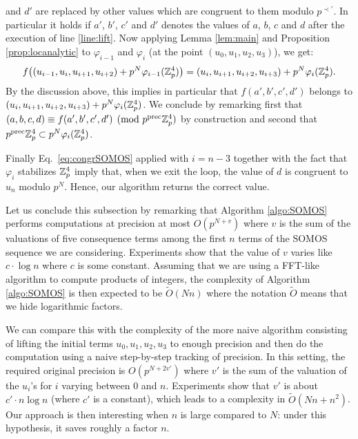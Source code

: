 \documentclass{lms}
\begin{document}
and $d'$ are replaced by other values which are congruent to them modulo
$p^{\prec'}$. In particular it holds if $a'$, $b'$, $c'$ and $d'$ denotes
the values of $a$, $b$, $c$ and $d$ after the execution of line
\ref{line:lift}. Now applying Lemma \ref{lem:main} and Proposition
\ref{prop:locanalytic} to $\varphi_{i-1}$ and $\varphi_i$ (at the point 
$(u_0, u_1, u_2, u_3)$), we get:
$$f\big((u_{i-1}, u_i, u_{i+1}, u_{i+2}) + p^N \varphi_{i-1}(\mathbb Z_p^4)\big)
= (u_i, u_{i+1}, u_{i+2}, u_{i+3}) + p^N \varphi_i(\mathbb Z_p^4).$$
By the discussion above, this implies in particular that $f(a',b',c',d')$
belongs to $(u_i, u_{i+1}, u_{i+2}, u_{i+3}) + p^N \varphi_i(\mathbb Z_p^4)$. We
conclude by remarking first that $(a,b,c,d) \equiv f(a',b',c',d') \pmod 
{p^{\text{\rm prec}} \mathbb Z_p^4}$ by construction and second that $p^{\text{\rm prec}} \mathbb Z_p^4 \subset
p^N \varphi_i(\mathbb Z_p^4)$.

Finally Eq.~\eqref{eq:congrSOMOS} applied with $i = n-3$ together with
the fact that $\varphi_i$ stabilizes $\mathbb Z_p^4$ imply that, when we exit
the loop, the value of $d$ is congruent to $u_n$ modulo $p^N$. Hence,
our algorithm returns the correct value.

\medskip

Let us conclude this subsection by remarking that Algorithm 
\ref{algo:SOMOS} performs computations at precision at most $O(p^{N+v})$ 
where $v$ is the sum of the valuations of five consequence terms among 
the first $n$ terms of the SOMOS sequence we are considering. 
Experiments show that the value of $v$ varies like $c \cdot \log n$ 
where $c$ is some constant. Assuming that we are using a FFT-like 
algorithm to compute products of integers, the complexity of Algorithm 
\ref{algo:SOMOS} is then expected to be $\tilde O(N n)$ where the 
notation $\tilde O$ means that we hide logarithmic factors.

We can compare this with the complexity of the more naive algorithm 
consisting of lifting the initial terms $u_0, u_1, u_2, u_3$ to enough 
precision and then do the computation using a naive step-by-step 
tracking of precision. In this setting, the required original precision 
is $O(p^{N+2v'})$ where $v'$ is the sum of the valuation of the $u_i$'s 
for $i$ varying between $0$ and $n$. Experiments show that $v'$ is about 
$c' \cdot n \log n$ (where $c'$ is a constant), which leads to a 
complexity in $\tilde O (N n + n^2)$. Our approach is then interesting
when $n$ is large compared to $N$: under this hypothesis, it saves
roughly a factor $n$.

\end{document}
